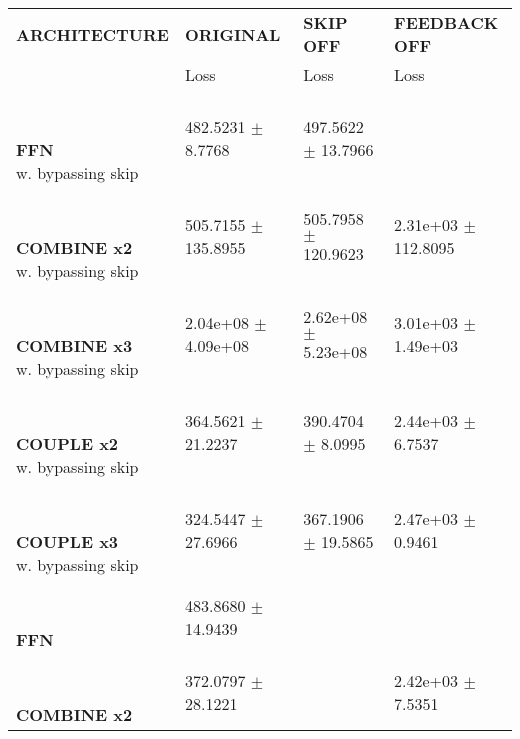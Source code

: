 
\begin{table}[ht]
    \centering
    \begin{tabular}{|>{\columncolor{gray!05}}l|l|l|l|}
        \hline
        \rowcolor{white}
        \textbf{\footnotesize ARCHITECTURE} & \textbf{\footnotesize ORIGINAL} & \textbf{\footnotesize SKIP OFF} & \textbf{\footnotesize FEEDBACK OFF} \\

        \rowcolor{white}
        & {\footnotesize Loss} & {\footnotesize Loss} & {\footnotesize Loss} \\
        \hline
\shortstack[l]{\\ {} \\ \textbf{FFN}\\{w. bypassing skip}} & 482.5231 $\pm$ 8.7768 & 497.5622 $\pm$ 13.7966 &  \\
 \hline 
\shortstack[l]{\\ {} \\ \textbf{COMBINE x2}\\{w. bypassing skip}} & 505.7155 $\pm$ 135.8955 & 505.7958 $\pm$ 120.9623 & 2.31e+03 $\pm$ 112.8095 \\
 \hline 
\shortstack[l]{\\ {} \\ \textbf{COMBINE x3}\\{w. bypassing skip}} & 2.04e+08 $\pm$ 4.09e+08 & 2.62e+08 $\pm$ 5.23e+08 & 3.01e+03 $\pm$ 1.49e+03 \\
 \hline 
\shortstack[l]{\\ {} \\ \textbf{COUPLE x2}\\{w. bypassing skip}} & 364.5621 $\pm$ 21.2237 & 390.4704 $\pm$ 8.0995 & 2.44e+03 $\pm$ 6.7537 \\
 \hline 
\shortstack[l]{\\ {} \\ \textbf{COUPLE x3}\\{w. bypassing skip}} & 324.5447 $\pm$ 27.6966 & 367.1906 $\pm$ 19.5865 & 2.47e+03 $\pm$ 0.9461 \\
 \hline 
\shortstack[l]{\\ {} \\ \textbf{FFN}\\{}} & 483.8680 $\pm$ 14.9439 &  &  \\
 \hline 
\shortstack[l]{\\ {} \\ \textbf{COMBINE x2}\\{}} & 372.0797 $\pm$ 28.1221 &  & 2.42e+03 $\pm$ 7.5351 \\

\end{tabular}
\end{table}
